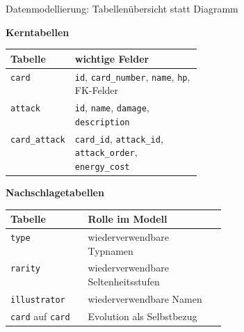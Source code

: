 \documentclass[aspectratio=169,11pt]{beamer}
\begin{document}
\begin{frame}{Datenmodellierung: Tabellen\"ubersicht statt Diagramm}
  \begin{minipage}[t]{0.49\textwidth}
    \begin{panel}[height=5.9cm]
      {\bfseries Kerntabellen}\par
      \vspace{0.25em}
      \begin{tabularx}{\linewidth}{@{}L{0.32\linewidth}Y@{}}
        \toprule
        \textbf{Tabelle} & \textbf{wichtige Felder} \\
        \midrule
        \texttt{card} & \texttt{id}, \texttt{card\_number}, \texttt{name}, \texttt{hp}, FK-Felder \\
        \texttt{attack} & \texttt{id}, \texttt{name}, \texttt{damage}, \texttt{description} \\
        \texttt{card\_attack} & \texttt{card\_id}, \texttt{attack\_id}, \texttt{attack\_order}, \texttt{energy\_cost} \\
        \bottomrule
      \end{tabularx}
    \end{panel}
  \end{minipage}\hfill
  \begin{minipage}[t]{0.49\textwidth}
    \begin{panel}[height=5.9cm]
      {\bfseries Nachschlagetabellen}\par
      \vspace{0.25em}
      \begin{tabularx}{\linewidth}{@{}L{0.36\linewidth}Y@{}}
        \toprule
        \textbf{Tabelle} & \textbf{Rolle im Modell} \\
        \midrule
        \texttt{type} & wiederverwendbare Typnamen \\
        \texttt{rarity} & wiederverwendbare Seltenheitsstufen \\
        \texttt{illustrator} & wiederverwendbare Namen \\
        \texttt{card} auf \texttt{card} & Evolution als Selbstbezug \\
        \bottomrule
      \end{tabularx}
    \end{panel}
  \end{minipage}
\end{frame}
\end{document}
